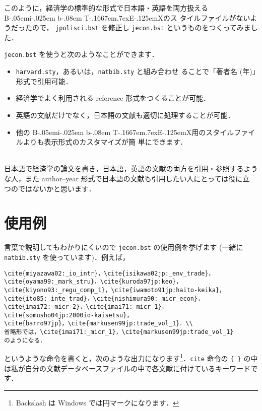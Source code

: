 \documentclass[a4j,10pt]{jarticle}
\def\BibTeX{{\rm B\kern-.05em{\sc i\kern-.025em b}\kern-.08em
    T\kern-.1667em\lower.7ex\hbox{E}\kern-.125emX}}
\begin{document}
このように，経済学の標準的な形式で日本語・英語を両方扱える \BibTeX のス
タイルファイルがないようだったので， \texttt{jpolisci.bst} を修正し
\texttt{jecon.bst} というものをつくってみました．

\texttt{jecon.bst} を使うと次のようなことができます．
\\

\begin{screen}
 \begin{itemize}
 \item \texttt{harvard.sty}，あるいは，\texttt{natbib.sty} と組み合わせ
       ることで「著者名 (年)」形式で引用可能．
 \item 経済学でよく利用される reference 形式をつくることが可能．
 \item 英語の文献だけでなく，日本語の文献も適切に処理することが可能．
 \item 他の \BibTeX 用のスタイルファイルよりも表示形式のカスタマイズが簡
       単にできます．
 \end{itemize}
\end{screen}
\\

日本語で経済学の論文を書き，日本語，英語の文献の両方を引用・参照するよう
な人，また author--year 形式で日本語の文献も引用したい人にとっては役に立
つのではないかと思います．

\section{使用例}

言葉で説明してもわかりにくいので \texttt{jecon.bst} の使用例を挙げます 
(一緒に\texttt{natbib.sty} を使っています)．例えば，
\begin{screen}
\begin{verbatim}
\cite{miyazawa02:_io_intr}，\cite{isikawa02jp:_env_trade}，
\cite{oyama99:_mark_stru}，\cite{kuroda97jp:keo}，
\cite{kiyono93:_regu_comp_1}，\cite{iwamoto91jp:haito-keika}，
\cite{ito85:_inte_trad}，\cite{nishimura90:_micr_econ}，
\cite{imai72:_micr_2}，\cite{imai71:_micr_1}，
\cite{somusho04jp:2000io-kaisetsu}，
\cite{barro97jp}，\cite{markusen99jp:trade_vol_1}．\\
省略形では，\cite{imai71:_micr_1}，\cite{markusen99jp:trade_vol_1}
のようになる．
\end{verbatim}
\end{screen}
というような命令を書くと，次のような出力になります\footnote{Backslash は 
Windows では円マークになります．}．\texttt{cite} 命令の \verb|{ }| の中
は私が自分の文献データベースファイルの中で各文献に付けているキーワードで
す．
\end{document}
